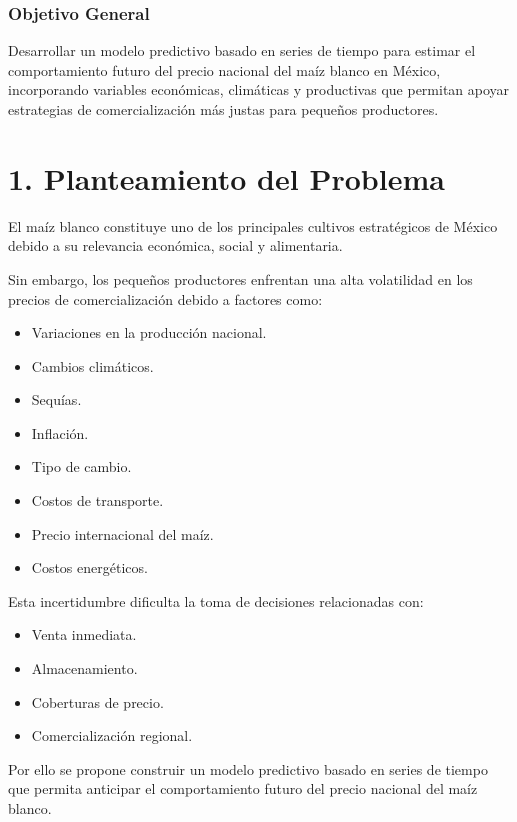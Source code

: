 \documentclass[11pt]{article}
\providecommand{\tightlist}{%
      \setlength{\itemsep}{0pt}\setlength{\parskip}{0pt}}
\begin{document}
\hypertarget{objetivo-general}{%
\subsubsection{Objetivo General}\label{objetivo-general}}

Desarrollar un modelo predictivo basado en series de tiempo para estimar
el comportamiento futuro del precio nacional del maíz blanco en México,
incorporando variables económicas, climáticas y productivas que permitan
apoyar estrategias de comercialización más justas para pequeños
productores.

    \hypertarget{planteamiento-del-problema}{%
\section{1. Planteamiento del
Problema}\label{planteamiento-del-problema}}

El maíz blanco constituye uno de los principales cultivos estratégicos
de México debido a su relevancia económica, social y alimentaria.

Sin embargo, los pequeños productores enfrentan una alta volatilidad en
los precios de comercialización debido a factores como:

\begin{itemize}
\tightlist
\item
  Variaciones en la producción nacional.
\item
  Cambios climáticos.
\item
  Sequías.
\item
  Inflación.
\item
  Tipo de cambio.
\item
  Costos de transporte.
\item
  Precio internacional del maíz.
\item
  Costos energéticos.
\end{itemize}

Esta incertidumbre dificulta la toma de decisiones relacionadas con:

\begin{itemize}
\tightlist
\item
  Venta inmediata.
\item
  Almacenamiento.
\item
  Coberturas de precio.
\item
  Comercialización regional.
\end{itemize}

Por ello se propone construir un modelo predictivo basado en series de
tiempo que permita anticipar el comportamiento futuro del precio
nacional del maíz blanco.
\end{document}
